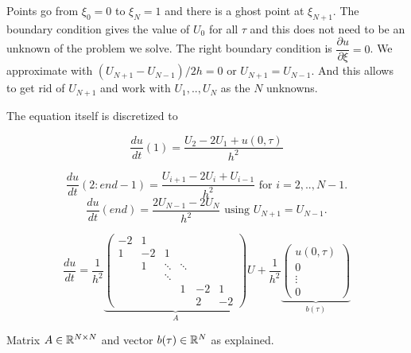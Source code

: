 Points go from $\xi_{0}=0$ to $\xi_N=1$ and there is a ghost point at $\xi_{N+1}$. The boundary condition gives the value of $U_0$ for all $\tau$ and this does not need to be an unknown of the problem we solve. The right boundary condition is $\dfrac{\partial u}{\partial \xi}=0$. We approximate with $(U_{N+1}-U_{N-1})/2h = 0$ or $U_{N+1}=U_{N-1}$. And this allows to get rid of $U_{N+1}$ and work with $U_{1}, .., U_{N}$ as the $N$ unknowns.

The equation itself is discretized to

$$\dfrac{du}{dt}(1)= \dfrac{U_{2}-2U_{1}+u(0,\tau)}{h^2}$$

$$\dfrac{du}{dt}(2:end-1)= \dfrac{U_{i+1}-2U_{i}+U_{i-1}}{h^2} \text{ for } i= 2, .., N-1.$$
$$\dfrac{du}{dt}(end)= \dfrac{2U_{N-1}-2U_{N}}{h^2} \text{ using } U_{N+1}=U_{N-1}.$$



$$\dfrac{du}{dt}= \dfrac{1}{h^2}
\underbrace{
\begin{pmatrix}
-2  & 1 &        &         &  & \\
1 & -2 & 1 &         &  & \\
       & 1 & \ddots & \ddots  &  & \\
       &        & \ddots &         &   &    \\
	   &        &        & 1 & -2 & 1\\
	   &			&		&		  & 2 & -2
\end{pmatrix}}_{A}U + \dfrac{1}{h^2} \underbrace{\begin{pmatrix}
u(0,\tau)\\
0\\
\vdots \\
0
\end{pmatrix}}_{b(\tau)}$$

Matrix $A\in \mathbb{R}^{N\times N}$ and vector $b(\tau)\in \mathbb{R}^{N}$ as explained.

